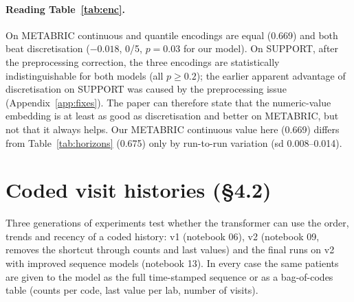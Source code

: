 \documentclass[11pt,a4paper]{article}
\newcommand{\Ctd}{C$_{td}$}
\begin{document}
\paragraph{Reading Table~\ref{tab:enc}.} On METABRIC continuous and quantile encodings are equal (0.669) and both beat
discretisation ($-0.018$, 0/5, $p=0.03$ for our model). On SUPPORT, after the preprocessing correction, the three
encodings are statistically indistinguishable for both models (all $p\ge0.2$); the earlier apparent advantage of
discretisation on SUPPORT was caused by the preprocessing issue (Appendix~\ref{app:fixes}). The paper can therefore
state that the numeric-value embedding is at least as good as discretisation and better on METABRIC, but not that it
always helps. Our METABRIC continuous value here (0.669) differs from Table~\ref{tab:horizons} (0.675) only by run-to-run
variation (sd 0.008--0.014).

\section{Coded visit histories (\S4.2)}\label{sec:ehr}
Three generations of experiments test whether the transformer can use the order, trends and recency of a coded
history: v1 (notebook 06), v2 (notebook 09, removes the shortcut through counts and last values) and the final runs on
v2 with improved sequence models (notebook 13). In every case the same patients are given to the model as the full
time-stamped sequence or as a bag-of-codes table (counts per code, last value per lab, number of visits).

\begin{table}[H]\centering\small
\caption{v1 and v2 cohorts with the small model (hidden 16, 2 layers, mean pooling). \Ctd{}, 3 splits.
``temporal'' = share of the risk carried by order, trends and recency.}
\label{tab:ehr12}
\end{table}
\end{document}
